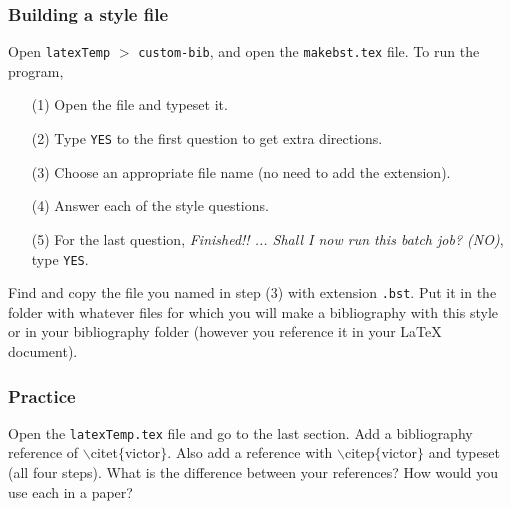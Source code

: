 \begin{frame}  \frametitle{Building a style file}
	Open \texttt{latexTemp} $>$ \texttt{custom-bib}, and open the \texttt{\color{highlight}makebst.tex} file. To run the program,
	\begin{itemize}
		\item[(1)] Open the file and typeset it.
		\item[(2)] Type \texttt{YES} to the first question to get extra directions.
		\item[(3)] Choose an appropriate file name (no need to add the extension).
		\item[(4)] Answer each of the style questions.
		\item[(5)] For the last question, \textit{Finished!! ...  Shall I now run this batch job? (NO)}, type \texttt{YES}.
	\end{itemize}
	Find and copy the file you named in step (3) with extension \texttt{.bst}. Put it in the folder with whatever files for which you will make a bibliography with this style or in your bibliography folder (however you reference it in your LaTeX document).
\end{frame}

\begin{frame}  \frametitle{Practice}
	Open the \texttt{\color{highlight}latexTemp.tex} file and go to the last section. Add a bibliography reference of {\color{command}$\backslash$citet}{\color{braces}$\{${\color{black}victor}$\}$}. Also add a reference with {\color{command}$\backslash$citep}{\color{braces}$\{${\color{black}victor}$\}$} and typeset (all four steps). What is the difference between your references? How would you use each in a paper?
\end{frame}



